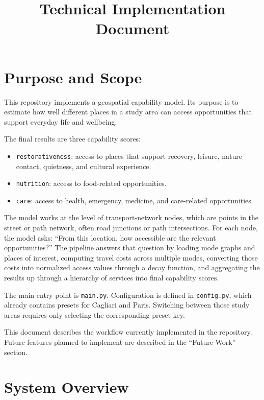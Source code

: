 \documentclass[11pt]{article}
\title{Technical Implementation Document}
\date{}
\begin{document}
\maketitle

\section{Purpose and Scope}

This repository implements a geospatial capability model. Its purpose is to estimate how well different places in a study area can access opportunities that support everyday life and wellbeing.

The final results are three capability scores:

\begin{itemize}
  \item \texttt{restorativeness}: access to places that support recovery, leisure, nature contact, quietness, and cultural experience.
  \item \texttt{nutrition}: access to food-related opportunities.
  \item \texttt{care}: access to health, emergency, medicine, and care-related opportunities.
\end{itemize}

The model works at the level of transport-network nodes, which are points in the street or path network, often road junctions or path intersections. For each node, the model asks: ``From this location, how accessible are the relevant opportunities?'' The pipeline answers that question by loading mode graphs and places of interest, computing travel costs across multiple modes, converting those costs into normalized access values through a decay function, and aggregating the results up through a hierarchy of services into final capability scores.

The main entry point is \texttt{main.py}. Configuration is defined in \texttt{config.py}, which already contains presets for Cagliari and Paris. Switching between those study areas requires only selecting the corresponding preset key.

This document describes the workflow currently implemented in the repository. Future features planned to implement are described in the ``Future Work'' section.

\section{System Overview}
\end{document}
